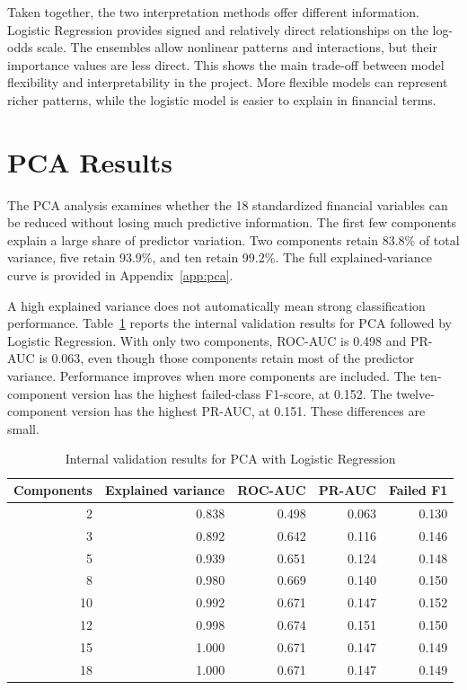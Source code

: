 \documentclass[11pt,a4paper]{article}
\begin{document}
Taken together, the two interpretation methods offer different information.
Logistic Regression provides signed and relatively direct relationships on the
log-odds scale. The ensembles allow nonlinear patterns and interactions, but
their importance values are less direct. This shows the main trade-off between
model flexibility and interpretability in the project. More flexible models can represent richer patterns,
while the logistic model is easier to explain in financial terms.

\section{PCA Results}
\label{sec:pca-results}

The PCA analysis examines whether the 18 standardized financial variables can
be reduced without losing much predictive information. The first few components
explain a large share of predictor variation. Two components retain 83.8\% of
total variance, five retain 93.9\%, and ten retain 99.2\%. The full
explained-variance curve is provided in Appendix~\ref{app:pca}.

A high explained variance does not automatically mean strong classification
performance.
Table~\ref{tab:pca-results} reports the internal validation results for PCA
followed by Logistic Regression. With only two components, ROC-AUC is 0.498 and
PR-AUC is 0.063, even though those components retain most of the predictor
variance. Performance improves when more components are included. The
ten-component version has the highest failed-class F1-score, at 0.152. The
twelve-component version has the highest PR-AUC, at 0.151. These differences
are small.

\begin{table}[H]
  \centering
  \caption{Internal validation results for PCA with Logistic Regression}
  \label{tab:pca-results}
  \small
  \begin{tabular}{rrrrr}
    \toprule
    Components & Explained variance & ROC-AUC & PR-AUC & Failed F1 \\
    \midrule
    2  & 0.838 & 0.498 & 0.063 & 0.130 \\
    3  & 0.892 & 0.642 & 0.116 & 0.146 \\
    5  & 0.939 & 0.651 & 0.124 & 0.148 \\
    8  & 0.980 & 0.669 & 0.140 & 0.150 \\
    10 & 0.992 & 0.671 & 0.147 & 0.152 \\
    12 & 0.998 & 0.674 & 0.151 & 0.150 \\
    15 & 1.000 & 0.671 & 0.147 & 0.149 \\
    18 & 1.000 & 0.671 & 0.147 & 0.149 \\
    \bottomrule
  \end{tabular}
\end{table}
\end{document}
